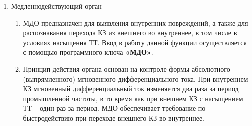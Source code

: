 \begin{enumerate}[label=\arabic{section}.\arabic{subsection}.\arabic{enumi}, labelsep=4pt, leftmargin=0pt, itemindent=57pt, itemsep=0pt, parsep=5pt]
\begin{enumerate}[label=\arabic{section}.\arabic{subsection}.\arabic{enumi}.\arabic*, labelsep=4pt, leftmargin=0em, itemindent=65pt, parsep=0pt]
\item
Принцип действия органа основан на различии скорости нарастания дифференциального и тормозного токов при внутренних и внешних повреждениях.
При внутреннем КЗ обеспечивается равный рост дифференциального и тормозного тока в промежутке правильной трансформации ТТ.
При внешнем КЗ нарастание тормозного тока происходит раньше, тогда как рост дифференциального тока обусловлен насыщением ТТ.

\item
В алгоритме БДО реализована логика выявления одновременного нарастания фронтов действующих значений дифференциального и тормозного токов.
Сигнал срабатывания БДО формируется при наличии превышении дифференциального тока уставки срабатывания ДОТХ и нарастанием фронтов дифференциального и тормозного токов в пределах заданного времени.

\end{enumerate}


\item Медленнодействующий орган

\begin{enumerate}[label=\arabic{section}.\arabic{subsection}.\arabic{enumi}.\arabic*, labelsep=4pt, leftmargin=0em, itemindent=65pt, parsep=0pt]

\item
МДО предназначен для выявления внутренних повреждений, а также для распознавания перехода КЗ из внешнего во внутреннее, в том числе в условиях насыщения ТТ.
Ввод в работу данной функции осуществляется с помощью программного ключа \textbf{«МДО»}.

\item
Принцип действия органа основан на контроле формы абсолютного (выпрямленного) мгновенного дифференциального тока.
При внутреннем КЗ мгновенный дифференциальный ток изменяется два раза за период промышленной частоты, в то время как при внешнем КЗ с насыщением ТТ – один раз за период.
МДО обеспечивает требование по быстродействию при переходе внешнего КЗ во внутреннее.


\end{enumerate}
\end{enumerate}
